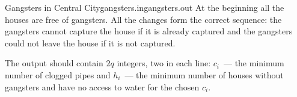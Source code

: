 \begin{problem}{Gangsters in Central City}{gangsters.in}{gangsters.out}{\timeLimit}
At the beginning all the houses are free of gangsters. 
All the changes form the correct sequence:
the gangsters cannot capture the house if it is already captured
and the gangsters could not leave the house if it is not captured.

\OutputFile

The output should contain $2q$ integers, two in each line:
$c_i$~--- the minimum number of clogged pipes and
$h_i$~--- the minimum number of houses without gangsters and have no access to water
for the chosen $c_i$.

\Example

\begin{example}
%
\end{example}%

\end{problem}


